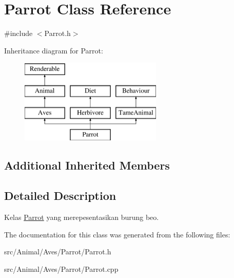 \hypertarget{classParrot}{\section{Parrot Class Reference}
\label{classParrot}
}


{\ttfamily \#include $<$Parrot.\+h$>$}

Inheritance diagram for Parrot\+:\begin{figure}[H]
\begin{center}
\leavevmode
\includegraphics[height=4.000000cm]{classParrot}
\end{center}
\end{figure}
\subsection*{Additional Inherited Members}


\subsection{Detailed Description}
Kelas \hyperlink{classParrot}{Parrot} yang merepesentasikan burung beo. 

The documentation for this class was generated from the following files\+:\begin{DoxyCompactItemize}
\item 
src/\+Animal/\+Aves/\+Parrot/Parrot.\+h\item 
src/\+Animal/\+Aves/\+Parrot/Parrot.\+cpp\end{DoxyCompactItemize}
